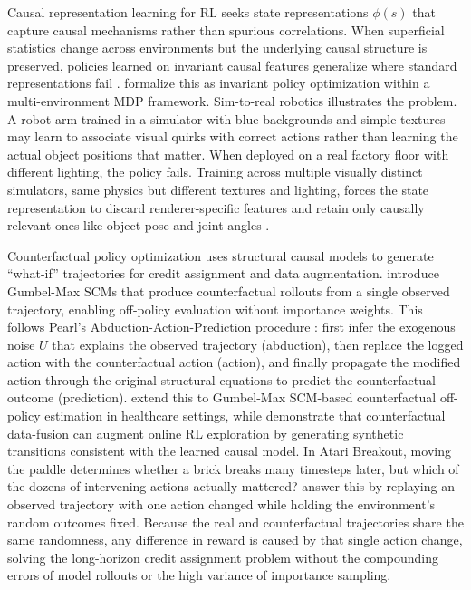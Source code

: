 Causal representation learning for RL seeks state representations $\phi(s)$ that capture causal mechanisms rather than spurious correlations. When superficial statistics change across environments but the underlying causal structure is preserved, policies learned on invariant causal features generalize where standard representations fail \citep{scholkopf2021toward}. \citet{dacostacunha2025unifying} formalize this as invariant policy optimization within a multi-environment MDP framework. Sim-to-real robotics illustrates the problem. A robot arm trained in a simulator with blue backgrounds and simple textures may learn to associate visual quirks with correct actions rather than learning the actual object positions that matter. When deployed on a real factory floor with different lighting, the policy fails. Training across multiple visually distinct simulators, same physics but different textures and lighting, forces the state representation to discard renderer-specific features and retain only causally relevant ones like object pose and joint angles \citep{dacostacunha2025unifying}.

Counterfactual policy optimization uses structural causal models to generate ``what-if'' trajectories for credit assignment and data augmentation. \citet{buesing2019woulda} introduce Gumbel-Max SCMs that produce counterfactual rollouts from a single observed trajectory, enabling off-policy evaluation without importance weights. This follows Pearl's Abduction-Action-Prediction procedure \citep{pearl2009causality}: first infer the exogenous noise $U$ that explains the observed trajectory (abduction), then replace the logged action with the counterfactual action (action), and finally propagate the modified action through the original structural equations to predict the counterfactual outcome (prediction). \citet{oberst2019counterfactual} extend this to Gumbel-Max SCM-based counterfactual off-policy estimation in healthcare settings, while \citet{forney2017counterfactual} demonstrate that counterfactual data-fusion can augment online RL exploration by generating synthetic transitions consistent with the learned causal model. In Atari Breakout, moving the paddle determines whether a brick breaks many timesteps later, but which of the dozens of intervening actions actually mattered? \citet{buesing2019woulda} answer this by replaying an observed trajectory with one action changed while holding the environment's random outcomes fixed. Because the real and counterfactual trajectories share the same randomness, any difference in reward is caused by that single action change, solving the long-horizon credit assignment problem without the compounding errors of model rollouts or the high variance of importance sampling.

